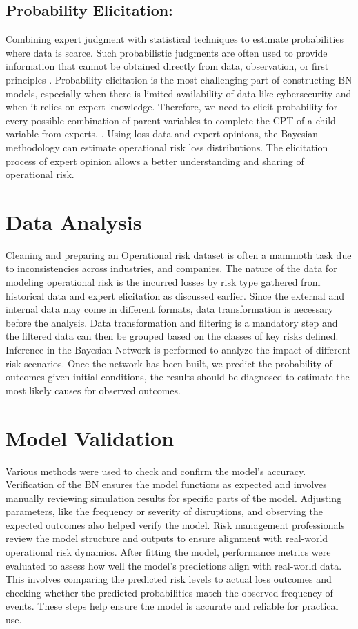 \subsection{Probability Elicitation: }
Combining expert judgment with statistical techniques to estimate probabilities where data is scarce. Such probabilistic judgments are often used to provide information that cannot be obtained directly from data, observation, or first principles \parencite{Hora2017}. Probability elicitation is the most challenging part of constructing BN models, especially when there is limited availability of data like cybersecurity and when it relies on expert knowledge.  Therefore, we need to elicit probability for every possible combination of parent variables to complete the CPT of a child variable from experts, \parencite{chockalingam_probability_2023}. Using loss data and expert opinions, the Bayesian methodology can estimate operational risk loss distributions. The elicitation process of expert opinion allows a better understanding and sharing of operational risk.
\section{Data Analysis}
Cleaning and preparing an Operational risk dataset is often a mammoth task due to inconsistencies across industries, and companies. The nature of the data for modeling operational risk is the incurred losses by risk type gathered from historical data and expert elicitation as discussed earlier. Since the external and internal data may come in different formats, data transformation is necessary before the analysis. Data transformation and filtering is a mandatory step and the filtered data can then be grouped based on the classes of key risks defined. Inference in the Bayesian Network is performed to analyze the impact of different risk scenarios. Once the network has been built, we predict the probability of outcomes given initial conditions, the results should be diagnosed to estimate the most likely causes for observed outcomes.
\section{Model Validation}
Various methods were used to check and confirm the model's accuracy. Verification of the BN ensures the model functions as expected and involves manually reviewing simulation results for specific parts of the model. Adjusting parameters, like the frequency or severity of disruptions, and observing the expected outcomes also helped verify the model. Risk management professionals review the model structure and outputs to ensure alignment with real-world operational risk dynamics. After fitting the model, performance metrics were evaluated to assess how well the model's predictions align with real-world data. This involves comparing the predicted risk levels to actual loss outcomes and checking whether the predicted probabilities match the observed frequency of events. These steps help ensure the model is accurate and reliable for practical use.
